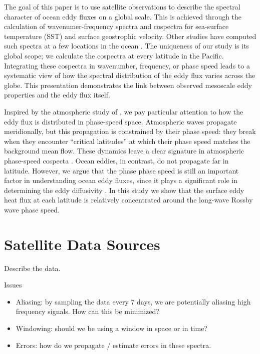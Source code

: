 \documentclass[10pt]{article}
\begin{document}
The goal of this paper is to use satellite observations to describe the spectral character of ocean eddy fluxes on a global scale. This is achieved through the calculation of wavenumer-frequency spectra and cospectra for sea-surface temperature (SST) and surface geostrophic velocity. Other studies have computed such spectra at a few locations in the ocean \citep{JayneMarotzke2002,ThosePapersCimGaveMe}. The uniqueness of our study is its global scope; we calculate the cospectra at every latitude in the Pacific. Integrating these cospectra in wavenumber, frequency, or phase speed leads to a systematic view of how the spectral distribution of the eddy flux varies across the globe. This presentation demonstrates the link between observed mesoscale eddy properties \citep[e.g.][]{CheltonEtAl2011} and the eddy flux itself.

Inspired by the atmospheric study of \citet{RandellHeld}, we pay particular attention to how the eddy flux is distributed in phase-speed space. Atmospheric waves propagate meridionally, but this propagation is constrained by their phase speed: they break when they encounter ``critical latitudes'' at which their phase speed matches the background mean flow. These dynamics leave a clear signature in atmospheric phase-speed cospecta \citep{ChenHeld2007}. Ocean eddies, in contrast, do not propagate far in latitude. However, we argue that the phase phase speed is still an important factor in understanding ocean eddy fluxes, since it plays a significant role in determining the eddy diffusivity \citep{AbernatheyEtAl2010,FerrariNikurashin2010}. In this study we show that the surface eddy heat flux at each latitude is relatively concentrated around the long-wave Rossby wave phase speed.

\section{Satellite Data Sources}

Describe the data.

Issues
\begin{itemize}
\item Aliasing: by sampling the data every 7 days, we are potentially aliasing high frequency signals. How can this be minimized?
\item Windowing: should we be using a window in space or in time?
\item Errors: how do we propagate / estimate errors in these spectra.
\end{itemize}
\end{document}
